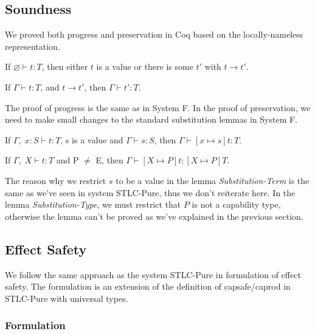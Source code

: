 \subsection{Soundness}

We proved both progress and preservation in Coq based on the
locally-nameless representation.

\begin{theorem}[Progress]
If $\varnothing \vdash t : T$, then either $t$ is a value or there is some
$t'$ with $t \longrightarrow t'$.
\end{theorem}

\begin{theorem}[Preservation]
If $\Gamma \vdash t : T$, and $t \longrightarrow t'$, then $\Gamma
\vdash t' : T$.
\end{theorem}

The proof of progress is the same as in System F. In the proof of
preservation, we need to make small changes to the standard
substitution lemmas in System F.

\begin{lemma}
  If $\Gamma,\; x:S \vdash t : T$, s is a value and
  $\Gamma \vdash s : S$, then $\Gamma \vdash [x \mapsto s]t : T$.
\end{lemma}

\begin{lemma}
  If $\Gamma,\; X \vdash t : T$ and P $\neq$ E,
  then $\Gamma \vdash [X \mapsto P]t : [X \mapsto P]T$.
\end{lemma}

The reason why we restrict $s$ to be a value in the lemma
\emph{Substitution-Term} is the same as we've seen in system
STLC-Pure, thus we don't reiterate here. In the lemma
\emph{Substitution-Type}, we must restrict that $P$ is not a
capability type, otherwise the lemma can't be proved as we've
explained in the previous section.

\subsection{Effect Safety}

We follow the same approach as the system STLC-Pure in formulation of
effect safety. The formulation is an extension of the definition of
capsafe/caprod in STLC-Pure with universal types.

\subsubsection{Formulation}

